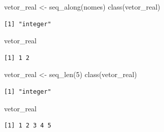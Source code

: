 \documentclass[
  10pt,
  ignorenonframetext,
]{beamer}
\newenvironment{Shaded}{\begin{snugshade}}{\end{snugshade}}
\newcommand{\DecValTok}[1]{\textcolor[rgb]{0.68,0.00,0.00}{#1}}
\newcommand{\FunctionTok}[1]{\textcolor[rgb]{0.28,0.35,0.67}{#1}}
\newcommand{\NormalTok}[1]{\textcolor[rgb]{0.00,0.23,0.31}{#1}}
\newcommand{\OtherTok}[1]{\textcolor[rgb]{0.00,0.23,0.31}{#1}}
\begin{document}
\begin{frame}[fragile]
\begin{Shaded}
\begin{Highlighting}[]
\NormalTok{vetor\_real  }\OtherTok{\textless{}{-}} \FunctionTok{seq\_along}\NormalTok{(nomes)}
\FunctionTok{class}\NormalTok{(vetor\_real)}
\end{Highlighting}
\end{Shaded}

\begin{verbatim}
[1] "integer"
\end{verbatim}

\begin{Shaded}
\begin{Highlighting}[]
\NormalTok{vetor\_real}
\end{Highlighting}
\end{Shaded}

\begin{verbatim}
[1] 1 2
\end{verbatim}

\begin{Shaded}
\begin{Highlighting}[]
\NormalTok{vetor\_real }\OtherTok{\textless{}{-}} \FunctionTok{seq\_len}\NormalTok{(}\DecValTok{5}\NormalTok{)}
\FunctionTok{class}\NormalTok{(vetor\_real)}
\end{Highlighting}
\end{Shaded}

\begin{verbatim}
[1] "integer"
\end{verbatim}

\begin{Shaded}
\begin{Highlighting}[]
\NormalTok{vetor\_real}
\end{Highlighting}
\end{Shaded}

\begin{verbatim}
[1] 1 2 3 4 5
\end{verbatim}
\end{frame}
\end{document}
